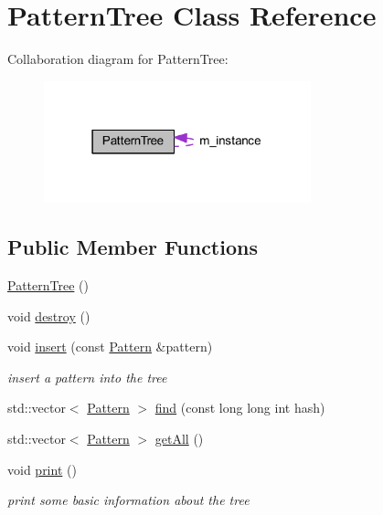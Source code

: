 \hypertarget{class_pattern_tree}{}\section{Pattern\+Tree Class Reference}
\label{class_pattern_tree}


Collaboration diagram for Pattern\+Tree\+:
\nopagebreak
\begin{figure}[H]
\begin{center}
\leavevmode
\includegraphics[width=219pt]{class_pattern_tree__coll__graph}
\end{center}
\end{figure}
\subsection*{Public Member Functions}
\begin{DoxyCompactItemize}
\item 
\hyperlink{class_pattern_tree_a8c393d9dc7966220803f670062d81cb5}{Pattern\+Tree} ()
\item 
void \hyperlink{class_pattern_tree_aeedfa28c34ce69dc494675e9662bd60b}{destroy} ()
\item 
void \hyperlink{class_pattern_tree_af698c6d454803b5debff21fe19eecab5}{insert} (const \hyperlink{class_pattern}{Pattern} \&pattern)
\begin{DoxyCompactList}\small\item\em insert a pattern into the tree \end{DoxyCompactList}\item 
std\+::vector$<$ \hyperlink{class_pattern}{Pattern} $>$ \hyperlink{class_pattern_tree_a86ae88dfb3fd379e2b914590b5a2f896}{find} (const long long int hash)
\item 
std\+::vector$<$ \hyperlink{class_pattern}{Pattern} $>$ \hyperlink{class_pattern_tree_a01a7afad6ad98b8d5958096c54c45b1f}{get\+All} ()
\item 
void \hyperlink{class_pattern_tree_a4db45bd0a698e9999c743f5ac05c33a6}{print} ()
\begin{DoxyCompactList}\small\item\em print some basic information about the tree \end{DoxyCompactList}\end{DoxyCompactItemize}
